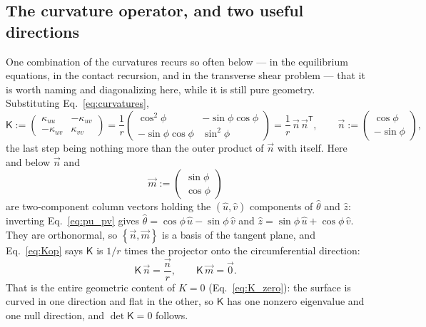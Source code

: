 \documentclass[11pt]{article}
\begin{document}
\subsection{The curvature operator, and two useful directions}\label{sec:nm_basis}
One combination of the curvatures recurs so often below --- in the equilibrium
equations, in the contact recursion, and in the transverse shear problem --- that
it is worth naming and diagonalizing here, while it is still pure geometry.
Substituting Eq.~\eqref{eq:curvatures},
\begin{equation}\label{eq:Kop}
    \mathsf K := \begin{pmatrix}
      \kappa_{uu} & -\kappa_{uv}\\ -\kappa_{uv} & \kappa_{vv}
    \end{pmatrix}
    = \frac{1}{r}\begin{pmatrix}
      \cos^{2}\phi & -\sin\phi\cos\phi\\
      -\sin\phi\cos\phi & \sin^{2}\phi
    \end{pmatrix}
    = \frac{1}{r}\,\vec n\,\vec n^{\mathsf T},
    \qquad
    \vec n := \begin{pmatrix}\cos\phi\\ -\sin\phi\end{pmatrix},
\end{equation}
the last step being nothing more than the outer product of $\vec n$ with itself.
Here and below $\vec n$ and
\begin{equation}\label{eq:nm_def}
    \vec m := \begin{pmatrix}\sin\phi\\ \cos\phi\end{pmatrix}
\end{equation}
are two-component column vectors holding the $\left(\hat u,\hat v\right)$
components of $\hat\theta$ and $\hat z$: inverting Eq.~\eqref{eq:pu_pv} gives
$\hat\theta = \cos\phi\,\hat u - \sin\phi\,\hat v$ and
$\hat z = \sin\phi\,\hat u + \cos\phi\,\hat v$. They are orthonormal, so
$\left\{\vec n,\vec m\right\}$ is a basis of the tangent plane, and
Eq.~\eqref{eq:Kop} says $\mathsf K$ is $1/r$ times the projector onto the
circumferential direction:
\begin{equation}\label{eq:Kop_action}
    \boxed{\;\mathsf K\,\vec n = \frac{\vec n}{r},
    \qquad
    \mathsf K\,\vec m = \vec 0.\;}
\end{equation}
That is the entire geometric content of $K = 0$ (Eq.~\ref{eq:K_zero}): the
surface is curved in one direction and flat in the other, so $\mathsf K$ has one
nonzero eigenvalue and one null direction, and $\det\mathsf K = 0$ follows.
\end{document}
